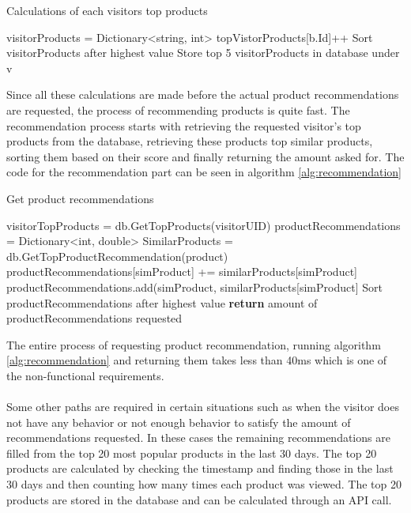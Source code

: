 \begin{algorithm}[H]
\caption{Calculations of each visitors top products}
\label{alg:topProducts}
\begin{algorithmic}[H]
\State visitorProducts = Dictionary<string, int>
\State topVistorProducts[b.Id]++
\EndFor
\State Sort visitorProducts after highest value
\State Store top 5 visitorProducts in database under v
\EndFor
\end{algorithmic}
\end{algorithm}

Since all these calculations are made before the actual product recommendations are requested, the process of recommending products is quite fast. The recommendation process starts with retrieving the requested visitor's top products from the database, retrieving these products top similar products, sorting them based on their score and finally returning the amount asked for. The code for the recommendation part can be seen in algorithm \ref{alg:recommendation}

\begin{algorithm}[H]
\caption{Get product recommendations}
\label{alg:recommendation}
\begin{algorithmic}[H]
\State visitorTopProducts = db.GetTopProducts(visitorUID)
\State productRecommendations = Dictionary<int, double>
\State SimilarProducts = db.GetTopProductRecommendation(product)
\State productRecommendations[simProduct] += similarProducts[simProduct]
\Else
\State productRecommendations.add(simProduct, similarProducts[simProduct]
\EndIf
\EndFor
\EndFor
\State Sort productRecommendations after highest value
\State \textbf{return} amount of productRecommendations requested
\State 
\end{algorithmic}
\end{algorithm}

The entire process of requesting product recommendation, running algorithm \ref{alg:recommendation} and returning them takes less than 40ms which is one of the non-functional requirements. \\\\
Some other paths are required in certain situations such as when the visitor does not have any behavior or not enough behavior to satisfy the amount of recommendations requested. In these cases the remaining recommendations are filled from the top 20 most popular products in the last 30 days. The top 20 products are calculated by checking the timestamp and finding those in the last 30 days and then counting how many times each product was viewed. The top 20 products are stored in the database and can be calculated through an API call.

